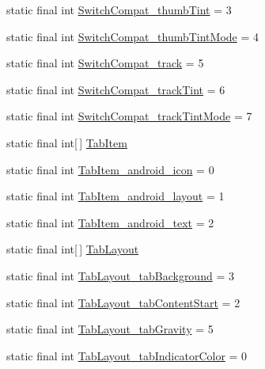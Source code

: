 \begin{CompactItemize}
\item 
static final int \hyperlink{classandroid_1_1support_1_1v4_1_1_r_1_1styleable_136537e09affe833ba67adc81baf4df6}{SwitchCompat\_\-thumbTint} = 3
\item 
static final int \hyperlink{classandroid_1_1support_1_1v4_1_1_r_1_1styleable_6e084fdf50ded0b3372355ed70bb4849}{SwitchCompat\_\-thumbTintMode} = 4
\item 
static final int \hyperlink{classandroid_1_1support_1_1v4_1_1_r_1_1styleable_e711e9fa38386ec6f701a57cc3ac8c6e}{SwitchCompat\_\-track} = 5
\item 
static final int \hyperlink{classandroid_1_1support_1_1v4_1_1_r_1_1styleable_d119b35aaef8f728924d474d789a2286}{SwitchCompat\_\-trackTint} = 6
\item 
static final int \hyperlink{classandroid_1_1support_1_1v4_1_1_r_1_1styleable_dd018911d038be332e08eef22a606e52}{SwitchCompat\_\-trackTintMode} = 7
\item 
static final int\mbox{[}$\,$\mbox{]} \hyperlink{classandroid_1_1support_1_1v4_1_1_r_1_1styleable_91eab1ea34174d58d08c76c2c097a4b4}{TabItem}
\item 
static final int \hyperlink{classandroid_1_1support_1_1v4_1_1_r_1_1styleable_2bfc174d7f5725cca2d71de0e14005c8}{TabItem\_\-android\_\-icon} = 0
\item 
static final int \hyperlink{classandroid_1_1support_1_1v4_1_1_r_1_1styleable_4b8fe999918d09fb6a54d5db061df9d3}{TabItem\_\-android\_\-layout} = 1
\item 
static final int \hyperlink{classandroid_1_1support_1_1v4_1_1_r_1_1styleable_babc8d1758b634fdce812a00987ed3f8}{TabItem\_\-android\_\-text} = 2
\item 
static final int\mbox{[}$\,$\mbox{]} \hyperlink{classandroid_1_1support_1_1v4_1_1_r_1_1styleable_d1f1104cdc4fac0ab4797d48f7efe351}{TabLayout}
\item 
static final int \hyperlink{classandroid_1_1support_1_1v4_1_1_r_1_1styleable_675e2f29080457fa431fc68be4479b4f}{TabLayout\_\-tabBackground} = 3
\item 
static final int \hyperlink{classandroid_1_1support_1_1v4_1_1_r_1_1styleable_df711e29dcdb60bbd96c539283d0f4f1}{TabLayout\_\-tabContentStart} = 2
\item 
static final int \hyperlink{classandroid_1_1support_1_1v4_1_1_r_1_1styleable_972b042e4a3fcafa9cafaf6453a759e2}{TabLayout\_\-tabGravity} = 5
\item 
static final int \hyperlink{classandroid_1_1support_1_1v4_1_1_r_1_1styleable_ecd068c380384ff47f22004dc6bf860e}{TabLayout\_\-tabIndicatorColor} = 0

\end{CompactItemize}

